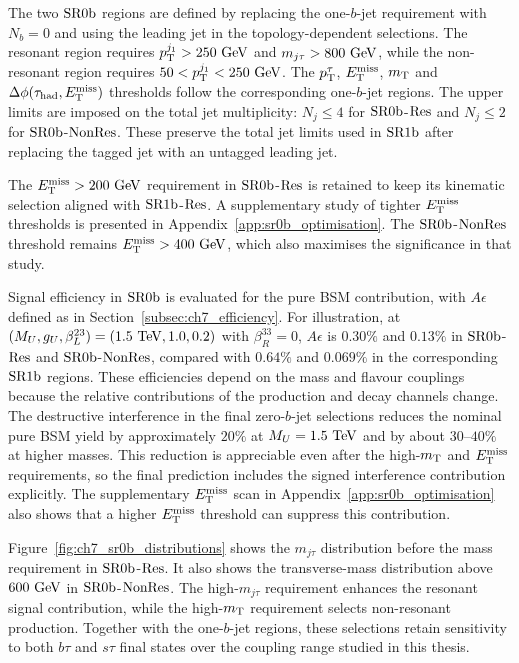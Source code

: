 The two $\mathrm{SR0b}$ regions are defined by replacing the one-$b$-jet requirement with $N_b=0$ and using the leading jet in the topology-dependent selections.
The resonant region requires $p_{\mathrm{T}}^{j_1}>250~\mathrm{GeV}$ and $m_{j\tau}>800~\mathrm{GeV}$, while the non-resonant region requires $50<p_{\mathrm{T}}^{j_1}<250~\mathrm{GeV}$.
The $p_{\mathrm{T}}^\tau$, $E_{\mathrm{T}}^{\mathrm{miss}}$, $m_{\mathrm{T}}$ and $\Delta\phi(\tau_{\mathrm{had}}, E_{\mathrm{T}}^{\mathrm{miss}})$ thresholds follow the corresponding one-$b$-jet regions.
The upper limits are imposed on the total jet multiplicity: $N_j\leq4$ for $\mathrm{SR0b}$-$\mathrm{Res}$ and $N_j\leq2$ for $\mathrm{SR0b}$-$\mathrm{NonRes}$.
These preserve the total jet limits used in $\mathrm{SR1b}$ after replacing the tagged jet with an untagged leading jet.

The $E_{\mathrm{T}}^{\mathrm{miss}}>200~\mathrm{GeV}$ requirement in $\mathrm{SR0b}$-$\mathrm{Res}$ is retained to keep its kinematic selection aligned with $\mathrm{SR1b}$-$\mathrm{Res}$.
A supplementary study of tighter $E_{\mathrm{T}}^{\mathrm{miss}}$ thresholds is presented in Appendix~\ref{app:sr0b_optimisation}.
The $\mathrm{SR0b}$-$\mathrm{NonRes}$ threshold remains $E_{\mathrm{T}}^{\mathrm{miss}}>400~\mathrm{GeV}$, which also maximises the significance in that study.

Signal efficiency in $\mathrm{SR0b}$ is evaluated for the pure BSM contribution, with $A\epsilon$ defined as in Section~\ref{subsec:ch7_efficiency}.
For illustration, at $(M_U,g_U,\beta_L^{23})=(1.5~\mathrm{TeV},1.0,0.2)$ with $\beta_R^{33}=0$, $A\epsilon$ is $0.30\%$ and $0.13\%$ in $\mathrm{SR0b}$-$\mathrm{Res}$ and $\mathrm{SR0b}$-$\mathrm{NonRes}$, compared with $0.64\%$ and $0.069\%$ in the corresponding $\mathrm{SR1b}$ regions.
These efficiencies depend on the mass and flavour couplings because the relative contributions of the production and decay channels change.
The destructive interference in the final zero-$b$-jet selections reduces the nominal pure BSM yield by approximately $20\%$ at $M_U=1.5~\mathrm{TeV}$ and by about $30$--$40\%$ at higher masses.
This reduction is appreciable even after the high-$m_{\mathrm{T}}$ and $E_{\mathrm{T}}^{\mathrm{miss}}$ requirements, so the final prediction includes the signed interference contribution explicitly.
The supplementary $E_{\mathrm{T}}^{\mathrm{miss}}$ scan in Appendix~\ref{app:sr0b_optimisation} also shows that a higher $E_{\mathrm{T}}^{\mathrm{miss}}$ threshold can suppress this contribution.

Figure~\ref{fig:ch7_sr0b_distributions} shows the $m_{j\tau}$ distribution before the mass requirement in $\mathrm{SR0b}$-$\mathrm{Res}$.
It also shows the transverse-mass distribution above $600~\mathrm{GeV}$ in $\mathrm{SR0b}$-$\mathrm{NonRes}$.
The high-$m_{j\tau}$ requirement enhances the resonant signal contribution, while the high-$m_{\mathrm{T}}$ requirement selects non-resonant production.
Together with the one-$b$-jet regions, these selections retain sensitivity to both $b\tau$ and $s\tau$ final states over the coupling range studied in this thesis.

